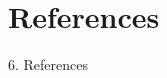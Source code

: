 \documentclass[11pt, aspectratio=169]{beamer}
\begin{document}
\section{References}
\begin{frame}[allowframebreaks]{6. References}
    
\end{frame}



    
    
    


\end{document}
